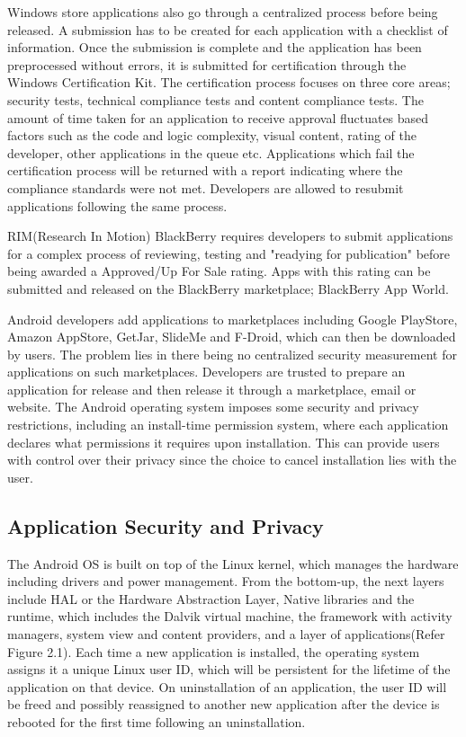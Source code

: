 Windows store applications also go through a centralized process before being released. A submission has to be created for each application with a checklist of information. Once the submission is complete and the application has been preprocessed without errors, it is submitted for certification through the Windows Certification Kit. The certification process focuses on three core areas; security tests, technical compliance tests and content compliance tests. The amount of time taken for an application to receive approval fluctuates based factors such as the code and logic complexity, visual content, rating of the developer, other applications in the queue etc. Applications which fail the certification process will be returned with a report indicating where the compliance standards were not met. Developers are allowed to resubmit applications following the same process.\cite{f}
\smallskip

RIM(Research In Motion) BlackBerry requires developers to submit applications for a complex process of reviewing, testing and "readying for publication" before being awarded a Approved/Up For Sale rating. Apps with this rating can be submitted and released on the BlackBerry marketplace; BlackBerry App World.\cite{j} 
\smallskip

Android developers add applications to marketplaces including Google PlayStore, Amazon AppStore, GetJar, SlideMe and F-Droid, which can then be downloaded by users. The problem lies in there being no centralized security measurement for applications on such marketplaces. Developers are trusted to prepare an application for release and then release it through a marketplace, email or website.\cite{g} The Android operating system imposes some security and privacy restrictions, including an install-time permission system, where each application declares what permissions it requires upon installation.\cite{h} This can provide users with control over their privacy since the choice to cancel installation lies with the user.

\subsection{Application Security and Privacy}
The Android OS is built on top of the Linux kernel, which manages the hardware including drivers and power management. From the bottom-up, the next layers include HAL or the Hardware Abstraction Layer, Native libraries and the runtime, which includes the Dalvik virtual machine, the framework with activity managers, system view and content providers, and a layer of applications(Refer Figure 2.1). Each time a new application is installed, the operating system assigns it a unique Linux user ID, which will be persistent for the lifetime of the application on that device. On uninstallation of an application, the user ID will be freed and possibly reassigned to another new application after the device is rebooted for the first time following an uninstallation.
\smallskip 

